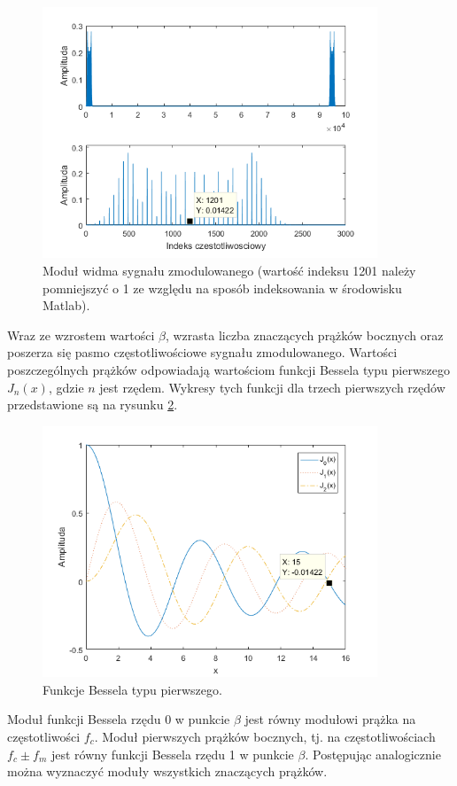 \begin{figure}[H]
	\centering
	\includegraphics[width=10cm]{grafiki/fm_widmo}
	\captionsetup{justification=centering}
	\caption{Moduł widma sygnału zmodulowanego (wartość indeksu 1201 należy pomniejszyć o 1 ze względu na sposób indeksowania w środowisku Matlab).}
	\label{rys:fm_widmo}
\end{figure}
Wraz ze wzrostem wartości $\beta$, wzrasta liczba znaczących prążków bocznych oraz poszerza się pasmo częstotliwościowe sygnału zmodulowanego.
Wartości poszczególnych prążków odpowiadają wartościom funkcji Bessela typu pierwszego $J_n(x)$, gdzie $n$ jest rzędem. Wykresy tych funkcji dla trzech pierwszych rzędów przedstawione są na rysunku \ref{rys:fm_bessel}.
\begin{figure}[H]
	\centering
	\includegraphics[width=10cm]{grafiki/fm_bessel}
	\captionsetup{justification=centering}
	\caption{Funkcje Bessela typu pierwszego.}
	\label{rys:fm_bessel}
\end{figure}

Moduł funkcji Bessela rzędu 0 w punkcie $\beta$ jest równy modułowi prążka na częstotliwości $f_c$. Moduł pierwszych prążków bocznych, tj. na częstotliwościach $f_c \pm f_m$ jest równy funkcji Bessela rzędu 1 w punkcie $\beta$. Postępując analogicznie można wyznaczyć moduły wszystkich znaczących prążków.

